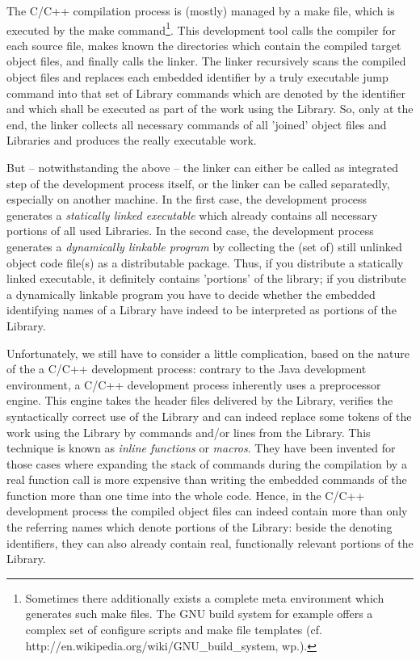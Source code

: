 The C/C++ compilation process is (mostly) managed by a make file, which is
executed by the make command\footnote{Sometimes there additionally exists a
complete meta environment which generates such make files. The GNU build system
for example offers a complex set of configure scripts and make file templates
(cf. http://en.wikipedia.org/wiki/GNU\_build\_system, wp.).}. This development
tool calls the compiler for each source file, makes known the directories which
contain the compiled target object files, and finally calls the linker.
The linker recursively scans the compiled object files and replaces each
embedded identifier by a truly executable jump command into that set of Library
commands which are denoted by the identifier and which shall be executed as part
of the work using the Library. So, only at the end, the linker collects all
necessary commands of all 'joined' object files and Libraries and produces the
really executable work.

But -- notwithstanding the above -- the linker can either be called as
integrated step of the development process itself, or the linker can
be called separatedly, especially on another machine. In the first case, the
development process generates a \emph{statically linked executable} which
already contains all necessary portions of all used Libraries. In the second
case, the development process generates a \emph{dynamically linkable program} by
collecting the (set of) still unlinked object code file(s) as a distributable
package. Thus, if you distribute a statically linked executable, it definitely
contains 'portions' of the library; if you distribute a dynamically linkable
program you have to decide whether the embedded identifying names of a Library
have indeed to be interpreted as portions of the Library.

Unfortunately, we still have to consider a little complication, based on the
nature of the a C/C++ development process: contrary to the Java development
environment, a C/C++ development process inherently uses a preprocessor engine.
This engine takes the header files delivered by the Library, verifies the
syntactically correct use of the Library and can indeed replace some tokens of
the work using the Library by commands and/or lines from the Library. This
technique is known as \emph{inline functions} or \emph{macros}. They have been
invented for those cases where expanding the stack of commands during the
compilation by a real function call is more expensive than writing the embedded
commands of the function more than one time into the whole code. Hence, in the
C/C++ development process the compiled object files can indeed contain more than
only the referring names which denote portions of the Library: beside the
denoting identifiers, they can also already contain real, functionally relevant
portions of the Library.
 
